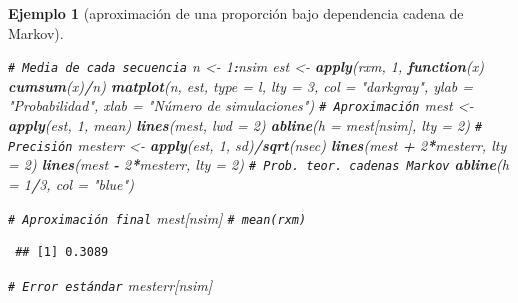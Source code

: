 \documentclass[
  spanish,
  10pt,
]{book}
\newenvironment{Shaded}{\begin{snugshade}}{\end{snugshade}}
\newcommand{\AttributeTok}[1]{\textcolor[rgb]{0.13,0.29,0.53}{#1}}
\newcommand{\CommentTok}[1]{\textcolor[rgb]{0.56,0.35,0.01}{\textit{#1}}}
\newcommand{\ControlFlowTok}[1]{\textcolor[rgb]{0.13,0.29,0.53}{\textbf{#1}}}
\newcommand{\DecValTok}[1]{\textcolor[rgb]{0.00,0.00,0.81}{#1}}
\newcommand{\FunctionTok}[1]{\textcolor[rgb]{0.13,0.29,0.53}{\textbf{#1}}}
\newcommand{\NormalTok}[1]{#1}
\newcommand{\OtherTok}[1]{\textcolor[rgb]{0.56,0.35,0.01}{#1}}
\newcommand{\SpecialCharTok}[1]{\textcolor[rgb]{0.81,0.36,0.00}{\textbf{#1}}}
\newcommand{\StringTok}[1]{\textcolor[rgb]{0.31,0.60,0.02}{#1}}
\theoremstyle{break}
\newtheorem{example}{Ejemplo}[chapter]
\theoremstyle{nonumberplain}
\renewcommand{\CommentTok}[1]{\textcolor[rgb]{0.41,0.41,0.41}{\texttt{#1}}}
\begin{document}
\begin{example}[aproximación de una proporción bajo dependencia cadena de Markov]
\begin{Shaded}
\begin{Highlighting}[]
\CommentTok{\# Media de cada secuencia}
\NormalTok{n }\OtherTok{\textless{}{-}} \DecValTok{1}\SpecialCharTok{:}\NormalTok{nsim}
\NormalTok{est }\OtherTok{\textless{}{-}} \FunctionTok{apply}\NormalTok{(rxm, }\DecValTok{1}\NormalTok{, }\ControlFlowTok{function}\NormalTok{(x) }\FunctionTok{cumsum}\NormalTok{(x)}\SpecialCharTok{/}\NormalTok{n)}
\FunctionTok{matplot}\NormalTok{(n, est, }\AttributeTok{type =} \StringTok{\textquotesingle{}l\textquotesingle{}}\NormalTok{, }\AttributeTok{lty =} \DecValTok{3}\NormalTok{, }\AttributeTok{col =} \StringTok{"darkgray"}\NormalTok{,}
        \AttributeTok{ylab =} \StringTok{"Probabilidad"}\NormalTok{, }\AttributeTok{xlab =} \StringTok{"Número de simulaciones"}\NormalTok{)}
\CommentTok{\# Aproximación}
\NormalTok{mest }\OtherTok{\textless{}{-}} \FunctionTok{apply}\NormalTok{(est, }\DecValTok{1}\NormalTok{, mean)}
\FunctionTok{lines}\NormalTok{(mest, }\AttributeTok{lwd =} \DecValTok{2}\NormalTok{)}
\FunctionTok{abline}\NormalTok{(}\AttributeTok{h =}\NormalTok{ mest[nsim], }\AttributeTok{lty =} \DecValTok{2}\NormalTok{)}
\CommentTok{\# Precisión}
\NormalTok{mesterr }\OtherTok{\textless{}{-}} \FunctionTok{apply}\NormalTok{(est, }\DecValTok{1}\NormalTok{, sd)}\SpecialCharTok{/}\FunctionTok{sqrt}\NormalTok{(nsec)}
\FunctionTok{lines}\NormalTok{(mest }\SpecialCharTok{+} \DecValTok{2}\SpecialCharTok{*}\NormalTok{mesterr, }\AttributeTok{lty =} \DecValTok{2}\NormalTok{)}
\FunctionTok{lines}\NormalTok{(mest }\SpecialCharTok{{-}} \DecValTok{2}\SpecialCharTok{*}\NormalTok{mesterr, }\AttributeTok{lty =} \DecValTok{2}\NormalTok{)}
\CommentTok{\# Prob. teor. cadenas Markov}
\FunctionTok{abline}\NormalTok{(}\AttributeTok{h =} \DecValTok{1}\SpecialCharTok{/}\DecValTok{3}\NormalTok{, }\AttributeTok{col =} \StringTok{"blue"}\NormalTok{)     }

\CommentTok{\# Aproximación final}
\NormalTok{mest[nsim] }\CommentTok{\# mean(rxm)}
\end{Highlighting}
\end{Shaded}

\begin{verbatim}
 ## [1] 0.3089
\end{verbatim}

\begin{Shaded}
\begin{Highlighting}[]
\CommentTok{\# Error estándar}
\NormalTok{mesterr[nsim]}
\end{Highlighting}
\end{Shaded}


\end{example}
\end{document}
